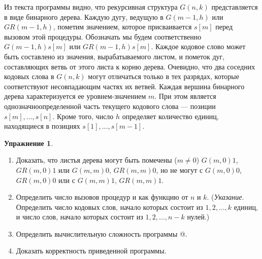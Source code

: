 \documentclass[12pt,a4paper]{article}
\theoremstyle{plain}
\theoremstyle{definition}
\newtheorem*{task}{Упражнение}
\theoremstyle{remark}
\begin{document}
Из текста программы видно, что рекурсивная структура $G(n,k)$ представляется в виде бинарного дерева. Каждую дугу, ведущую в $G(m-1,h)$ или $GR(m-1,h)$, пометим значением, которое присваивается $s[m]$ перед вызовом этой процедуры. Обозначать мы будем соответственно $G(m-1,h)s[m]$ или $GR(m-1,h)s[m]$. Каждое кодовое слово может быть составлено из значения, вырабатываемого листом, и пометок дуг, составляющих ветвь от этого листа к корню дерева. Очевидно, что два соседних кодовых слова в $G(n,k)$ могут отличаться только в тех разрядах, которые соответствуют несовпадающим частях их ветвей. Каждая вершина бинарного дерева характеризуется ее уровнем-значением $m$. При этом является однозначноопределенной часть текущего кодового слова --- позиции $s[m],\ldots,s[n]$. Кроме того, число $h$ определяет количество единиц, находящиеся в позициях $s[1],\ldots,s[m-1]$.

\begin{task}
~\\
\begin{enumerate}
\item Доказать, что листья дерева могут быть помечены ($m\ne0$) $G(m,0)1$, $GR(m,0)1$ или $G(m,m)0$, $GR(m,m)0$, но не могут с $G(m,0)0$, $GR(m,0)0$ или с $G(m,m)1$, $GR(m,m)1$.
\item Определить число вызовов процедур \verb@G@ и \verb@GR@ как функцию от $n$ и $k$. (\textit{Указание}. Определить число кодовых слов, начало которых состоит из $1,2,\ldots,k$ единиц, и число слов, начало которых состоит из $1,2,\ldots,n-k$ нулей.)
\item Определить вычислительную сложность программы @.
\item Доказать корректность приведенной программы.
\end{enumerate}
\end{task}
\end{document}
